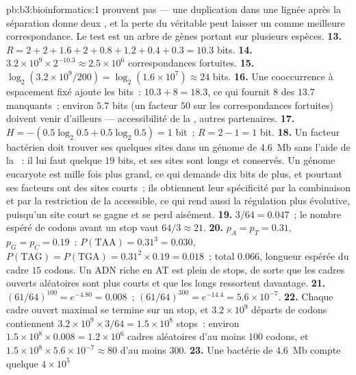 \begin{solution}{pb:b3:bioinformatics:1}
prouvent pas --- une duplication dans une lignée après la séparation
donne deux , et la perte du véritable  peut
laisser un  comme meilleure correspondance. Le test est un
arbre de gènes portant sur plusieurs espèces.
\textbf{13.} $R = 2 + 2 + 1.6 + 2 + 0.8 + 1.2 + 0.4 + 0.3 = 10.3$ bits.
\textbf{14.} $3.2\times 10^{9}\times 2^{-10.3} \approx 2.5\times 10^{6}$
correspondances fortuites.
\textbf{15.} $\log_{2}(3.2\times 10^{9}/200) = \log_{2}(1.6\times 10^{7})
\approx 24$ bits.
\textbf{16.} Une cooccurrence à espacement fixé ajoute les bits~: $10.3 + 8 =
18.3$, ce qui fournit $8$ des $13.7$ manquants~; environ $5.7$ bits (un
facteur $50$ sur les correspondances fortuites) doivent venir d'ailleurs
--- accessibilité de la , autres partenaires.
\textbf{17.} $H = -(0.5\log_{2}0.5 + 0.5\log_{2}0.5) = 1$ bit~; $R = 2 -
1 = 1$ bit.
\textbf{18.} Un facteur bactérien doit trouver ses quelques sites dans
un génome de \qty{4.6}{Mb} sans l'aide de la ~: il lui faut
quelque $19$ bits, et ses sites sont longs et conservés. Un génome
eucaryote est mille fois plus grand, ce qui demande dix bits de plus, et
pourtant ses facteurs ont des sites courts~; ils obtiennent leur
spécificité par la combinaison et par la restriction de la 
accessible, ce qui rend aussi la régulation plus évolutive, puisqu'un
site court se gagne et se perd aisément.
\textbf{19.} $3/64 = 0.047$~; le nombre espéré de codons avant un stop
vaut $64/3 \approx 21$.
\textbf{20.} $p_{A} = p_{T} = 0.31$, $p_{G} = p_{C} = 0.19$~: $P(\text{TAA})
= 0.31^{3} = 0.030$, $P(\text{TAG}) = P(\text{TGA}) = 0.31^{2}\times 0.19
= 0.018$~; total $0.066$, longueur espérée du cadre $15$ codons. Un ADN
riche en AT est plein de stops, de sorte que les cadres ouverts
aléatoires sont plus courts et que les longs ressortent davantage.
\textbf{21.} $(61/64)^{100} = e^{-4.80} = 0.008$~; $(61/64)^{300} =
e^{-14.4} = 5.6\times 10^{-7}$.
\textbf{22.} Chaque cadre ouvert maximal se termine sur un stop, et
$3.2\times
10^{9}$ départs de codons contiennent $3.2\times 10^{9}\times 3/64 = 1.5\times
10^{8}$ stops~: environ $1.5\times 10^{8}\times 0.008 = 1.2\times 10^{6}$
cadres aléatoires d'au moins $100$ codons, et $1.5\times 10^{8}\times
5.6\times 10^{-7} \approx 80$ d'au moins $300$.
\textbf{23.} Une bactérie de \qty{4.6}{Mb} compte quelque $4\times 10^{5}$

\end{solution}
